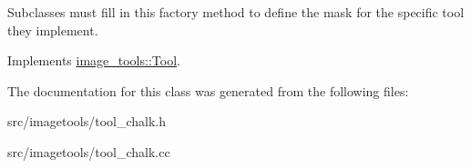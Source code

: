 Subclasses must fill in this factory method to define the mask for the specific tool they implement. 

Implements \hyperlink{classimage__tools_1_1Tool_a7d58325846dbc0467e52221daa1310a7}{image\+\_\+tools\+::\+Tool}.



The documentation for this class was generated from the following files\+:\begin{DoxyCompactItemize}
\item 
src/imagetools/tool\+\_\+chalk.\+h\item 
src/imagetools/tool\+\_\+chalk.\+cc\end{DoxyCompactItemize}
